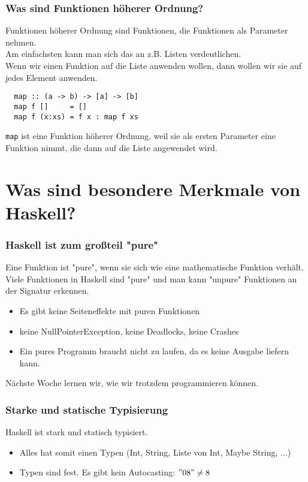 \documentclass[10pt]{beamer}
\begin{document}
\begin{frame}[fragile]
 \frametitle{Was sind Funktionen höherer Ordnung?}
 Funktionen höherer Ordnung sind Funktionen, die Funktionen als Parameter nehmen.\\\vspace*{0.5cm}
 \pause
 Am einfachsten kann man sich das an z.B. Listen verdeutlichen.\\
 \pause
 Wenn wir einen Funktion auf die Liste anwenden wollen, dann wollen wir sie auf jedes Element anwenden.\\
 \pause
 \begin{lstlisting}
  map :: (a -> b) -> [a] -> [b]
  map f []     = []
  map f (x:xs) = f x : map f xs
 \end{lstlisting}
 \pause
 \texttt{map} ist eine Funktion höherer Ordnung, weil sie als ersten Parameter eine Funktion nimmt, die dann auf die Liste angewendet wird.
\end{frame}

\section{Was sind besondere Merkmale von Haskell?}

\begin{frame}[fragile]
 \frametitle{Haskell ist zum großteil "pure"}
 Eine Funktion ist "pure", wenn sie sich wie eine mathematische Funktion verhält. Viele Funktionen in Haskell sind "pure" und man kann "unpure" Funktionen an der Signatur erkennen.\\\vspace*{0.5cm}
 \pause
 \begin{itemize}
  \item Es gibt keine Seiteneffekte mit puren Funktionen
  \pause
  \item keine NullPointerException, keine Deadlocks, keine Crashes
  \pause
  \item Ein pures Programm braucht nicht zu laufen, da es keine Ausgabe liefern kann.
  \pause
 \end{itemize}
 Nächste Woche lernen wir, wie wir trotzdem programmieren können.
\end{frame}


\begin{frame}[fragile]
 \frametitle{Starke und statische Typisierung}
 Haskell ist stark und statisch typisiert.\\\vspace*{0.5cm}
 \pause
 \begin{itemize}
  \item Alles hat somit einen Typen (Int, String, Liste von Int, Maybe String, ...)
  \pause
  \item Typen sind fest. Es gibt kein Autocasting: $"08" \neq 8$
 \end{itemize}
\end{frame}
\end{document}

